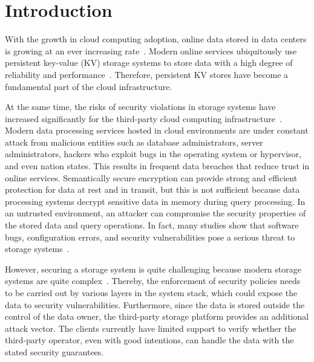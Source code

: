 \section{Introduction}
With the growth in cloud computing adoption, online data stored in data centers is growing at an ever increasing rate~\cite{}. Modern online services ubiquitously use persistent key-value (KV) storage systems to store data with a high degree of reliability and performance~\cite{}. Therefore, persistent KV stores have become a fundamental part of the cloud infrastructure.

At the same time, the risks of security violations in storage systems have increased significantly for the third-party cloud computing infrastructure~\cite{}. Modern data processing services hosted in cloud environments are under constant attack from malicious entities such as database administrators, server administrators, hackers who exploit bugs in the operating system or hypervisor, and even nation states. This results in frequent data breaches that reduce trust in online services. Semantically secure encryption can provide strong and efficient protection for data at rest and in transit, but this is not sufficient because data processing systems decrypt sensitive data in memory during query processing. In an untrusted environment, an attacker can compromise the security properties of the stored data and query operations. In fact, many studies show that software bugs, configuration errors, and security vulnerabilities pose a serious threat to storage systems~\cite{}.

However, securing a storage system is quite challenging because modern storage systems are quite complex~\cite{}. Thereby, the enforcement of security policies needs to be carried out by various layers in the system stack, which could expose the data to security vulnerabilities. Furthermore, since the data is stored outside the control of the data owner, the third-party storage platform provides an additional attack vector. The clients currently have limited support to verify whether the third-party operator, even with good intentions, can handle the data with the stated security guarantees.

